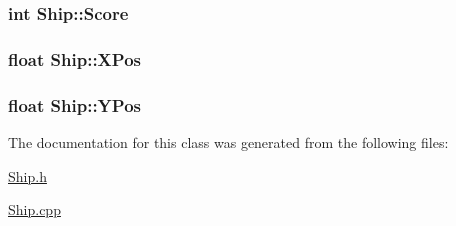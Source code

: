 \hypertarget{classShip_abf2e70f207f8abcec0428b7a12ede9f1}{
\subsubsection[{Score}]{\setlength{\rightskip}{0pt plus 5cm}int Ship\-::\-Score\hspace{0.3cm}{\ttfamily [private]}}}\label{classShip_abf2e70f207f8abcec0428b7a12ede9f1}
\hypertarget{classShip_a6549912d1c63b46eb331aca1cf9adea1}{
\subsubsection[{X\-Pos}]{\setlength{\rightskip}{0pt plus 5cm}float Ship\-::\-X\-Pos\hspace{0.3cm}{\ttfamily [private]}}}\label{classShip_a6549912d1c63b46eb331aca1cf9adea1}
\hypertarget{classShip_a66b847cf1abf5b0102dc769949543322}{
\subsubsection[{Y\-Pos}]{\setlength{\rightskip}{0pt plus 5cm}float Ship\-::\-Y\-Pos\hspace{0.3cm}{\ttfamily [private]}}}\label{classShip_a66b847cf1abf5b0102dc769949543322}


The documentation for this class was generated from the following files\-:\begin{DoxyCompactItemize}
\item 
\hyperlink{Ship_8h}{Ship.\-h}\item 
\hyperlink{Ship_8cpp}{Ship.\-cpp}\end{DoxyCompactItemize}
